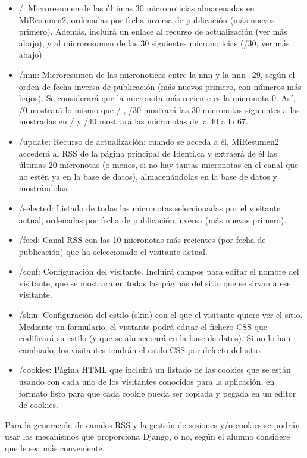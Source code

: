 \begin{itemize}
  \begin{itemize}
  \item /: Microresumen de las últimas 30 micronoticias almacenadas en MiResumen2, ordenadas por fecha inversa de publicación (más nuevos primero). Además, incluirá un enlace al recurso de actualización (ver más abajo), y al microresumen de las 30 siguientes micronoticias (/30, ver más abajo)
  \item /nnn: Microresumen de las micronoticas entre la nnn y la nnn+29, según el orden de fecha inversa de publicación (más nuevos primero, con números más bajos). Se considerará que la micronota más reciente es la micronota 0. Así, /0 mostrará lo mismo que / , /30 mostrará las 30 micronotas siguientes a las mostradas en / y /40 mostrará las micronotas de la 40 a la 67.
  \item /update: Recurso de actualización: cuando se acceda a él, MiResumen2 accederá al RSS de la página principal de Identi.ca y extraerá de él las últimas 20 micronotas (o menos, si no hay tantas micronotas en el canal que no estén ya en la base de datos), almacenándolas en la base de datos y mostrándolas.
  \item /selected: Listado de todas las micronotas seleccionadas por el visitante actual, ordenadas por fecha de publicación inversa (más nuevas primero).
  \item /feed: Canal RSS  con las 10 micronotas más recientes (por fecha de publicación) que ha seleccionado el visitante actual. 
  \item /conf: Configuración del visitante. Incluirá campos para editar el nombre del visitante, que se mostrará en todas las páginas del sitio que se sirvan a ese visitante.
  \item /skin: Configuración del estilo (skin) con el que el visitante quiere ver el sitio. Mediante un formulario, el visitante podrá editar el fichero CSS que codificará su estilo (y que se almacenará en la base de datos). Si no lo han cambiado, los visitantes tendrán el estilo CSS por defecto del sitio.
  \item /cookies: Página HTML que incluirá un listado de las cookies que se están usando con cada uno de los visitantes conocidos para la aplicación, en formato listo para que cada cookie pueda ser copiada y pegada en un editor de cookies.
  \end{itemize}

\end{itemize}

Para la generación de canales RSS y la gestión de sesiones y/o cookies se podrán usar los mecanismos que proporciona Django, o no, según el alumno considere que le sea más conveniente.

